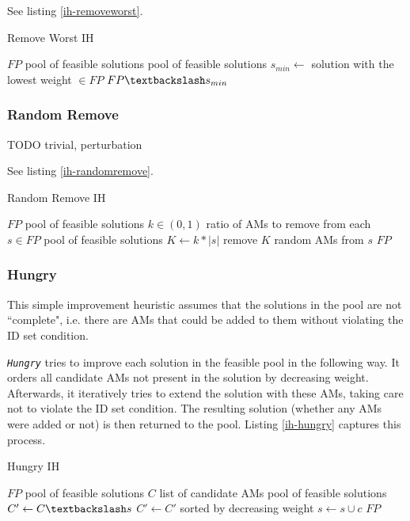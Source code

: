 \documentclass[a4paper,12pt,oneside]{report}
\newcommand{\heu}[1]{\texttt{\textit{#1}}}
\begin{document}
See listing \ref{ih-removeworst}.

\begin{algorithm}
\caption{Remove Worst IH}
\label{ih-removeworst}
\begin{algorithmic}
\REQUIRE $FP$ pool of feasible solutions
\ENSURE pool of feasible solutions
\STATE $s_{min} \gets $ solution with the lowest weight $\in FP$
\RETURN $FP \textbackslash s_{min}$
\end{algorithmic}
\end{algorithm}

\subsubsection{Random Remove}

TODO trivial, perturbation

See listing \ref{ih-randomremove}.

\begin{algorithm}
\caption{Random Remove IH}
\label{ih-randomremove}
\begin{algorithmic}
\REQUIRE $FP$ pool of feasible solutions
\REQUIRE $k \in (0,1)$ ratio of AMs to remove from each $s \in FP$
\ENSURE pool of feasible solutions
  \STATE $K \gets k * |s|$
  \STATE remove $K$ random AMs from $s$
\ENDFOR
\RETURN $FP$
\end{algorithmic}
\end{algorithm}

\subsubsection{Hungry}

This simple improvement heuristic assumes that the solutions in the pool are not ``complete", i.e. there are AMs that could be added to them without violating the ID set condition.

\heu{Hungry} tries to improve each solution in the feasible pool in the following way. It orders all candidate AMs not present in the solution by decreasing weight. Afterwards, it iteratively tries to extend the solution with these AMs, taking care not to violate the ID set condition. The resulting solution (whether any AMs were added or not) is then returned to the pool. Listing \ref{ih-hungry} captures this process.

\begin{algorithm}
\caption{Hungry IH}
\label{ih-hungry}
\begin{algorithmic}
\REQUIRE $FP$ pool of feasible solutions
\REQUIRE $C$ list of candidate AMs
\ENSURE pool of feasible solutions
  \STATE {}
  \STATE $C' \gets C \textbackslash s$
  \STATE $C' \gets C'$ sorted by decreasing weight
      \STATE $s \gets s \cup c$
    \ENDIF
  \ENDFOR
\ENDFOR
\RETURN $FP$
\end{algorithmic}
\end{algorithm}
\end{document}

